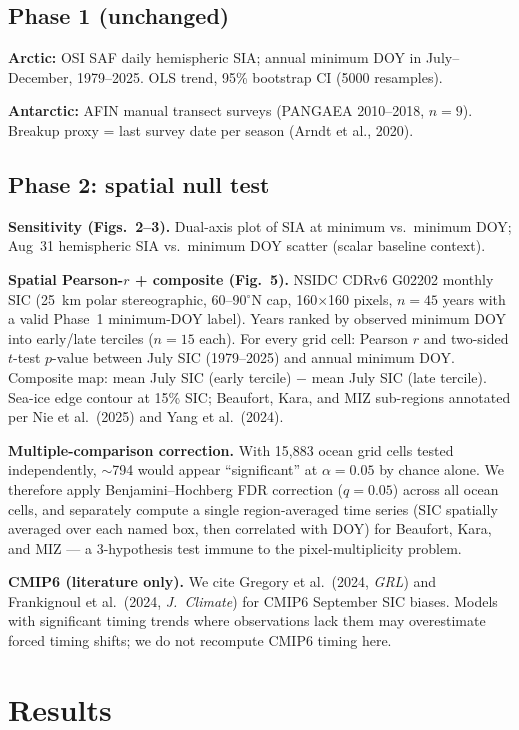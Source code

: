 \documentclass[11pt,a4paper]{article}
\begin{document}
\subsection{Phase 1 (unchanged)}
\textbf{Arctic:} OSI SAF daily hemispheric SIA; annual minimum DOY in July--December, 1979--2025. OLS trend, 95\% bootstrap CI (5000 resamples).

\textbf{Antarctic:} AFIN manual transect surveys (PANGAEA 2010--2018, $n=9$). Breakup proxy = last survey date per season (Arndt et al., 2020).

\subsection{Phase 2: spatial null test}
\textbf{Sensitivity (Figs.~2--3).} Dual-axis plot of SIA at minimum vs.\ minimum DOY; Aug~31 hemispheric SIA vs.\ minimum DOY scatter (scalar baseline context).

\textbf{Spatial Pearson-$r$ + composite (Fig.~5).} NSIDC CDRv6 G02202 monthly SIC (25~km polar stereographic, 60--90$^\circ$N cap, 160$\times$160 pixels, $n=45$ years with a valid Phase~1 minimum-DOY label). Years ranked by observed minimum DOY into early/late terciles ($n=15$ each). For every grid cell: Pearson $r$ and two-sided $t$-test $p$-value between July SIC (1979--2025) and annual minimum DOY. Composite map: mean July SIC (early tercile) $-$ mean July SIC (late tercile). Sea-ice edge contour at 15\% SIC; Beaufort, Kara, and MIZ sub-regions annotated per Nie et al.\ (2025) and Yang et al.\ (2024).

\textbf{Multiple-comparison correction.} With 15{,}883 ocean grid cells tested independently, $\sim$794 would appear ``significant'' at $\alpha=0.05$ by chance alone. We therefore apply Benjamini--Hochberg FDR correction ($q=0.05$) across all ocean cells, and separately compute a single region-averaged time series (SIC spatially averaged over each named box, then correlated with DOY) for Beaufort, Kara, and MIZ --- a 3-hypothesis test immune to the pixel-multiplicity problem.

\textbf{CMIP6 (literature only).} We cite Gregory et al.\ (2024, \textit{GRL}) and Frankignoul et al.\ (2024, \textit{J.~Climate}) for CMIP6 September SIC biases. Models with significant timing trends where observations lack them may overestimate forced timing shifts; we do not recompute CMIP6 timing here.

\section{Results}
\end{document}
